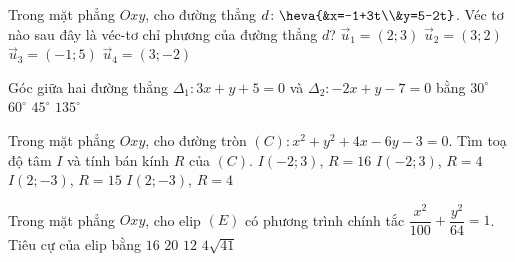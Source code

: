 \begin{ex}%
	Trong mặt phẳng $Oxy$, cho đường thẳng $d\colon\heva{&x=-1+3t\\&y=5-2t}$. Véc tơ nào sau đây là véc-tơ chỉ phương của đường thẳng $d$?
	\choice
	{$\vec{u}_1=(2;3)$}
	{$\vec{u}_2=(3;2)$}
	{$\vec{u}_3=(-1;5)$}
	{\True $\vec{u}_4=(3;-2)$}
\end{ex}
\begin{ex}%
	Góc giữa hai đường thẳng $\Delta_1\colon 3x+y+5=0$ và $\Delta_2\colon -2x+y-7=0$ bằng
	\choice
	{$30^{\circ}$}
	{$60^{\circ}$}
	{\True $45^{\circ}$}
	{$135^{\circ}$}
\end{ex}

\begin{ex}%
	Trong mặt phẳng $Oxy$, cho đường tròn $(C)\colon x^2+y^2+4x-6y-3=0$. Tìm toạ độ tâm $I$ và tính bán kính $R$ của $(C)$.
	\choice
	{$I(-2;3)$, $R=16$}
	{\True $I(-2;3)$, $R=4$}
	{$I(2;-3)$, $R=15$}
	{$I(2;-3)$, $R=4$}
\end{ex}

\begin{ex}%
	Trong mặt phẳng $Oxy$, cho elip $(E)$ có phương trình chính tắc $\dfrac{x^2}{100}+\dfrac{y^2}{64}=1$. Tiêu cự của elip bằng
	\choice
	{$16$}
	{$20$}
	{\True $12$}
	{$4\sqrt{41}$}
\end{ex}

